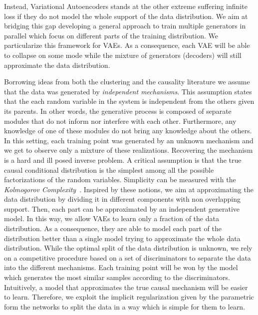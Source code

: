 \documentclass{article}
\begin{document}
Instead, Variational Autoencoders stands at the other extreme suffering infinite loss if they do not model the whole support of the data distribution. We aim at bridging this gap developing a general approach to train multiple generators in parallel which focus on different parts of the training distribution. We particularize this framework for VAEs. As a consequence, each VAE will be able to collapse on some mode while the mixture of generators (decoders) will still approximate the data distribution.

Borrowing ideas from both the clustering and the causality literature we assume that the data was generated by \textit{independent mechanisms}. This assumption states that the each random variable in the system is independent from the others given its parents. In other words, the generative process is composed of separate modules that do not inform nor interfere with each other. Furthermore, any knowledge of one of these modules do not bring any knowledge about the others. In this setting, each training point was generated by an unknown mechanism and we get to observe only a mixture of these realizations. Recovering the mechanism is a hard and ill posed inverse problem. A critical assumption is that the true causal conditional distribution is the simplest among all the possible factorizations of the random variables. Simplicity can be measured with the \textit{Kolmogorov Complexity}~\cite{janzing2010causal}. 
Inspired by these notions, we aim at approximating the data distribution by dividing it in different components with non overlapping support. Then, each  part can be approximated by an independent generative model. In this way, we allow VAEs to learn only a fraction of the data distribution. As a consequence, they are able to model each part of the distribution better than a single model trying to approximate the whole data distribution. While the optimal split of the data distribution is unknown, we rely on a competitive procedure based on a set of discriminators to separate the data into the different mechanisms. Each training point will be won by the model which generates the most similar samples according to the discriminators.  Intuitively, a model that approximates the true causal mechanism will be easier to learn. Therefore, we exploit the implicit regularization given by the parametric form the networks to split the data in a way which is simple for them to learn.
\end{document}
